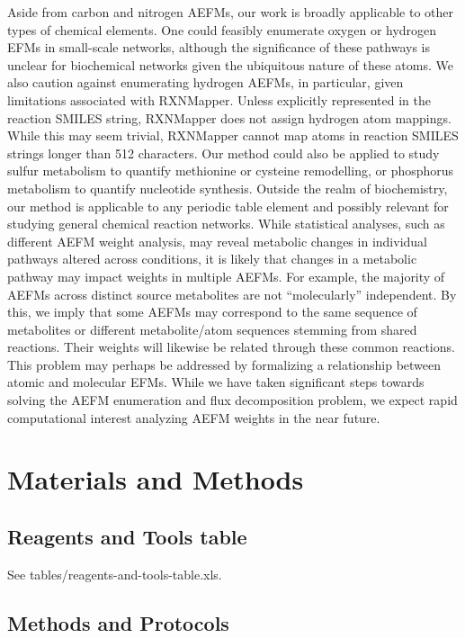\documentclass[12pt]{article}
\begin{document}
Aside from carbon and nitrogen AEFMs, our work is broadly applicable to
other types of chemical elements. One could feasibly enumerate oxygen or
hydrogen EFMs in small-scale networks, although the significance of these
pathways is unclear for biochemical networks given the ubiquitous nature
of these atoms. We also caution against enumerating hydrogen AEFMs, in
particular, given limitations associated with RXNMapper. Unless explicitly
represented in the reaction SMILES string, RXNMapper does not assign
hydrogen atom mappings. While this may seem trivial, RXNMapper cannot map
atoms in reaction SMILES strings longer than 512 characters. Our method
could also be applied to study sulfur metabolism to quantify methionine or
cysteine remodelling, or phosphorus metabolism to quantify nucleotide
synthesis. Outside the realm of biochemistry, our method is 
applicable to any periodic table element and possibly relevant for
studying general chemical reaction networks. While statistical analyses,
such as different AEFM weight analysis, may reveal metabolic changes in
individual pathways altered across conditions, it is likely that changes
in a metabolic pathway may impact weights in multiple AEFMs. For example,
the majority of AEFMs across distinct source metabolites are not
``molecularly'' independent. By this, we imply that some AEFMs may
correspond to the same sequence of metabolites or different
metabolite/atom sequences stemming from shared reactions. Their weights
will likewise be related through these common reactions. This problem may
perhaps be addressed by formalizing a relationship between atomic and
molecular EFMs. While we have taken significant steps towards solving the
AEFM enumeration and flux decomposition problem, we expect rapid
computational interest analyzing AEFM weights in the near future.

\section*{Materials and Methods}

\subsection*{Reagents and Tools table}

See tables/reagents-and-tools-table.xls.

\subsection*{Methods and Protocols}
\end{document}
